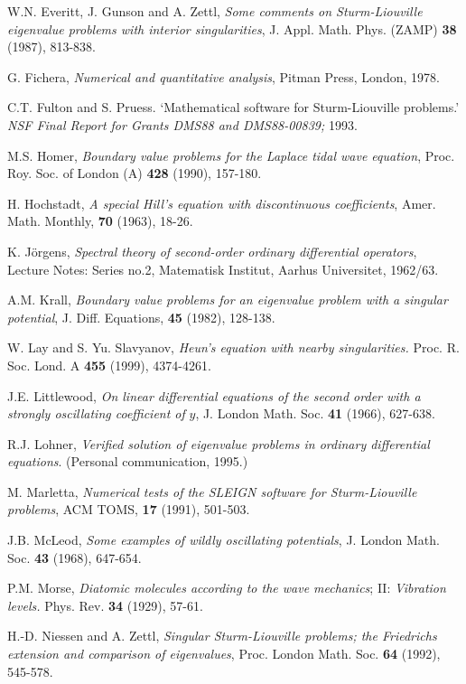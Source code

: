 \documentclass[12pt]{amsart}%
\theoremstyle{plain}
\numberwithin{equation}{section}
\begin{document}
\begin{thebibliography}{9}
W.N. Everitt, J. Gunson and A. Zettl, \emph{Some comments on
Sturm-Liouville eigenvalue problems with interior singularities}, J. Appl.
Math. Phys. (ZAMP) \textbf{38} (1987), 813-838.

G. Fichera, \emph{Numerical and quantitative analysis}, Pitman
Press, London, 1978.

C.T. Fulton and S. Pruess. `Mathematical software for
Sturm-Liouville problems.' \emph{NSF Final Report for Grants DMS88 and
DMS88-00839; }1993.

M.S. Homer, \emph{Boundary value problems for the Laplace tidal
wave equation}, Proc. Roy. Soc. of London (A) \textbf{428} (1990), 157-180.

H. Hochstadt, \emph{A special Hill's equation with discontinuous
coefficients}, Amer. Math. Monthly, \textbf{70 }(1963), 18-26.

K. J\"{o}rgens, \emph{Spectral theory of second-order ordinary
differential operators}, Lecture Notes: Series no.2, Matematisk Institut,
Aarhus Universitet, 1962/63.

A.M. Krall, \emph{Boundary value problems for an eigenvalue
problem with a singular potential}, J. Diff. Equations, \textbf{45} (1982), 128-138.

W. Lay and S. Yu. Slavyanov, \emph{Heun's equation with nearby
singularities.} Proc. R. Soc. Lond. A \textbf{455} (1999), 4374-4261.

J.E. Littlewood, \emph{On linear differential equations of the
second order with a strongly oscillating coefficient of }$y$, J. London Math.
Soc. \textbf{41} (1966), 627-638.

R.J. Lohner, \emph{Verified solution of eigenvalue problems in
ordinary differential equations}. (Personal communication, 1995.)

M. Marletta, \emph{Numerical tests of the SLEIGN software for
Sturm-Liouville problems}, ACM TOMS, \textbf{17 }(1991), 501-503.

J.B. McLeod, \emph{Some examples of wildly oscillating
potentials}, J. London Math. Soc. \textbf{43} (1968), 647-654.

P.M. Morse, \emph{Diatomic molecules according to the wave
mechanics}; II: \emph{Vibration levels. }Phys. Rev. \textbf{34} (1929), 57-61.

H.-D. Niessen and A. Zettl, \emph{Singular Sturm-Liouville
problems; the Friedrichs extension and comparison of eigenvalues}, Proc.
London Math. Soc. \textbf{64} (1992), 545-578.


\end{thebibliography}
\end{document}
